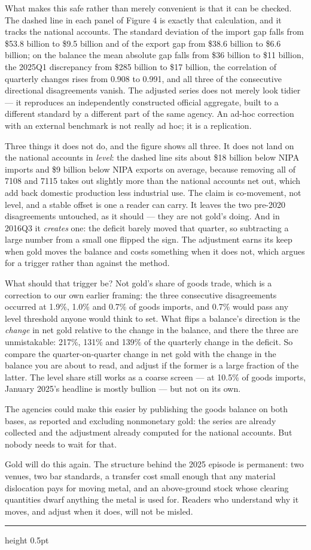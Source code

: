 \documentclass[11pt]{article}
\begin{document}
What makes this safe rather than merely convenient is that it can be checked.
The dashed line in each panel of Figure 4 is exactly that calculation, and it
tracks the national accounts. The standard deviation of the import gap falls
from \$53.8 billion to \$9.5 billion and of the export gap from \$38.6 billion
to \$6.6 billion; on the balance the mean absolute gap falls from \$36 billion
to \$11 billion, the 2025Q1 discrepancy from \$285 billion to \$17 billion, the
correlation of quarterly changes rises from 0.908 to 0.991, and all three of
the consecutive directional disagreements vanish. The adjusted series does not
merely look tidier --- it reproduces an independently constructed official
aggregate, built to a different standard by a different part of the same
agency. An ad-hoc correction with an external benchmark is not really ad hoc;
it is a replication.

Three things it does not do, and the figure shows all three. It does not land on
the national accounts in \emph{level}: the dashed line sits about \$18 billion
below NIPA imports and \$9 billion below NIPA exports on average, because
removing all of 7108 and 7115 takes out slightly more than the national accounts
net out, which add back domestic production less industrial use. The claim is
co-movement, not level, and a stable offset is one a reader can carry. It leaves
the two pre-2020 disagreements untouched, as it should --- they are not gold's
doing. And in 2016Q3 it \emph{creates} one: the deficit barely moved that
quarter, so subtracting a large number from a small one flipped the sign. The
adjustment earns its keep when gold moves the balance and costs something when
it does not, which argues for a trigger rather than against the method.

What should that trigger be? Not gold's share of goods trade, which is a
correction to our own earlier framing: the three consecutive disagreements
occurred at 1.9\%, 1.0\% and 0.7\% of goods imports, and 0.7\% would pass any
level threshold anyone would think to set. What flips a balance's direction is
the \emph{change} in net gold relative to the change in the balance, and there
the three are unmistakable: 217\%, 131\% and 139\% of the quarterly change in
the deficit. So compare the quarter-on-quarter change in net gold with the
change in the balance you are about to read, and adjust if the former is a
large fraction of the latter. The
level share still works as a coarse screen --- at 10.5\% of goods imports,
January 2025's headline is mostly bullion --- but not on its own.

The agencies could make this easier by publishing the goods balance on both
bases, as reported and excluding nonmonetary gold: the series are already
collected and the adjustment already computed for the national accounts. But
nobody needs to wait for that.

Gold will do this again. The structure behind the 2025 episode is permanent:
two venues, two bar standards, a transfer cost small enough that any material
dislocation pays for moving metal, and an above-ground stock whose clearing
quantities dwarf anything the metal is used for. Readers who understand why it
moves, and adjust when it does, will not be misled.

{\color{rule}\hrule height 0.5pt}
\theendnotes
\end{document}
